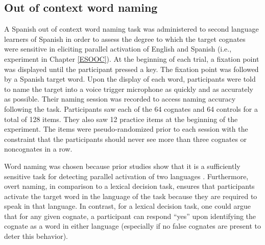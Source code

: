 
\subsection{Out of context word naming}
A Spanish out of context word naming task was administered to second language learners of Spanish in order to assess the degree to which the target cognates were sensitive in eliciting parallel activation of English and Spanish (i.e., experiment in Chapter \ref{ESOOC}). At the beginning of each trial, a fixation point was displayed until the participant pressed a key. The fixation point was followed by a Spanish target word. Upon the display of each word, participants were told to name the  target into a voice trigger microphone as quickly and as accurately as possible. Their naming session was recorded to access naming accuracy following the task. Participants saw each of the 64 cognates and 64 controls for a total of 128 items. They also saw 12 practice items at the beginning of the experiment. The items were pseudo-randomized prior to each session with the constraint that the  participants should never see more than three cognates or noncognates in a row. 


Word naming was chosen because prior studies show that it is a sufficiently sensitive task for detecting parallel activation of two languages \parencite[e.g.,][]{Schwartz2007}. Furthermore, overt naming, in comparison to a lexical decision task, ensures that participants activate the target word in the language of the task because they are required to speak in that language. In contrast, for a lexical decision task, one could argue that for any given cognate, a participant can respond ``yes'' upon identifying the cognate as a word in either language (especially if no false cognates are present to deter this behavior).

